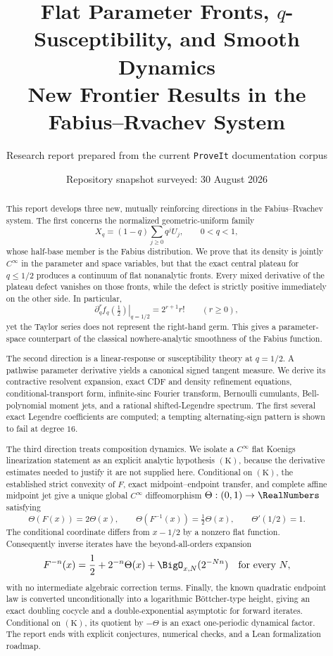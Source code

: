 \documentclass[11pt,oneside]{article}
\title{\bfseries Flat Parameter Fronts, \(q\)-Susceptibility, and Smooth Dynamics\\[0.25em]
\Large New Frontier Results in the Fabius--Rvachev System}
\author{Research report prepared from the current \texttt{ProveIt} documentation corpus}
\date{Repository snapshot surveyed: 30 August 2026}
\theoremstyle{definition}
\theoremstyle{remark}
\begin{document}
\maketitle

\begin{abstract}
This report develops three new, mutually reinforcing directions in the Fabius--Rvachev
system.  The first concerns the normalized geometric-uniform family
\[
 X_q=(1-q)\sum_{j\ge0}q^jU_j,
 \qquad 0<q<1,
\]
whose half-base member is the Fabius distribution.  We prove that its density is jointly
\(C^\infty\) in the parameter and space variables, but that the exact central plateau for
\(q\le1/2\) produces a continuum of flat nonanalytic fronts.  Every mixed derivative of the
plateau defect vanishes on those fronts, while the defect is strictly positive immediately on
the other side.  In particular,
\[
 \left.\partial_q^r f_q\!\left(\tfrac12\right)\right|_{q=1/2}
 =2^{r+1}r!\qquad(r\ge0),
\]
yet the Taylor series does not represent the right-hand germ.  This gives a parameter-space
counterpart of the classical nowhere-analytic smoothness of the Fabius function.

The second direction is a linear-response or susceptibility theory at \(q=1/2\).  A pathwise
parameter derivative yields a canonical signed tangent measure.  We derive its contractive
resolvent expansion, exact CDF and density refinement equations, conditional-transport form,
infinite-sinc Fourier transform, Bernoulli cumulants, Bell-polynomial moment jets, and a
rational shifted-Legendre spectrum.  The first several exact Legendre coefficients are
computed; a tempting alternating-sign pattern is shown to fail at degree \(16\).

The third direction treats composition dynamics.  We isolate a \(C^\infty\) flat Koenigs
linearization statement as an explicit analytic hypothesis \(\mathrm{(K)}\), because the
derivative estimates needed to justify it are not supplied here.  Conditional on
\(\mathrm{(K)}\), the established strict convexity of \(F\), exact midpoint--endpoint transfer,
and complete affine midpoint jet give a unique global \(C^\infty\) diffeomorphism
\(\Theta:(0,1)\to\RealNumbers\) satisfying
\[
 \Theta(F(x))=2\Theta(x),\qquad
 \Theta(F^{-1}(x))=\tfrac12\Theta(x),\qquad
 \Theta'(1/2)=1.
\]
The conditional coordinate differs from \(x-1/2\) by a nonzero flat function.  Consequently
inverse
iterates have the beyond-all-orders expansion
\[
 F^{-n}(x)=\frac12+2^{-n}\Theta(x)+\BigO_{x,N}(2^{-Nn})
 \quad\text{for every }N,
\]
with no intermediate algebraic correction terms.  Finally, the known quadratic endpoint law
is converted unconditionally into a logarithmic B\"ottcher-type height, giving an exact
doubling cocycle and a double-exponential asymptotic for forward iterates.  Conditional on
\(\mathrm{(K)}\), its quotient by \(-\Theta\) is an exact one-periodic dynamical factor.  The
report ends with explicit conjectures, numerical checks, and a Lean formalization roadmap.
\end{abstract}
\end{document}
